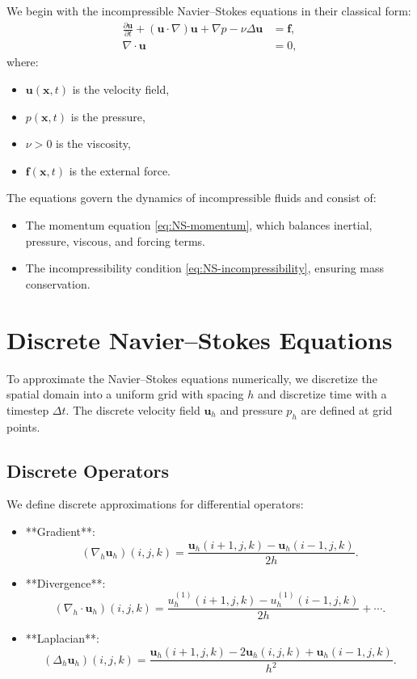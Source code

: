 We begin with the incompressible Navier--Stokes equations in their classical form:
\begin{align}
\frac{\partial \mathbf{u}}{\partial t} + (\mathbf{u} \cdot \nabla) \mathbf{u} + \nabla p - \nu \Delta \mathbf{u} &= \mathbf{f}, \label{eq:NS-momentum} \\
\nabla \cdot \mathbf{u} &= 0, \label{eq:NS-incompressibility}
\end{align}
where:
\begin{itemize}
    \item $\mathbf{u}(\mathbf{x}, t)$ is the velocity field,
    \item $p(\mathbf{x}, t)$ is the pressure,
    \item $\nu > 0$ is the viscosity,
    \item $\mathbf{f}(\mathbf{x}, t)$ is the external force.
\end{itemize}

The equations govern the dynamics of incompressible fluids and consist of:
\begin{itemize}
    \item The momentum equation \eqref{eq:NS-momentum}, which balances inertial, pressure, viscous, and forcing terms.
    \item The incompressibility condition \eqref{eq:NS-incompressibility}, ensuring mass conservation.
\end{itemize}

\section{Discrete Navier--Stokes Equations}

To approximate the Navier--Stokes equations numerically, we discretize the spatial domain into a uniform grid with spacing $h$ and discretize time with a timestep $\Delta t$. The discrete velocity field $\mathbf{u}_h$ and pressure $p_h$ are defined at grid points.

\subsection{Discrete Operators}

We define discrete approximations for differential operators:
\begin{itemize}
    \item **Gradient**:
    \begin{equation}
    (\nabla_h \mathbf{u}_h)(i,j,k) = \frac{\mathbf{u}_h(i+1,j,k) - \mathbf{u}_h(i-1,j,k)}{2h}.
    \end{equation}
    \item **Divergence**:
    \begin{equation}
    (\nabla_h \cdot \mathbf{u}_h)(i,j,k) = \frac{u_h^{(1)}(i+1,j,k) - u_h^{(1)}(i-1,j,k)}{2h} + \cdots.
    \end{equation}
    \item **Laplacian**:
    \begin{equation}
    (\Delta_h \mathbf{u}_h)(i,j,k) = \frac{\mathbf{u}_h(i+1,j,k) - 2\mathbf{u}_h(i,j,k) + \mathbf{u}_h(i-1,j,k)}{h^2}.
    \end{equation}
\end{itemize}


